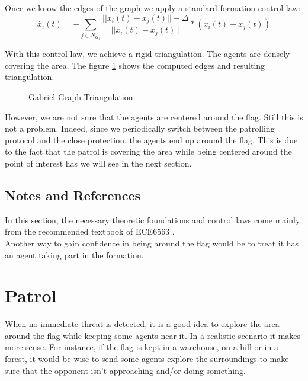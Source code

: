 \documentclass[journal]{IEEEtran}
\begin{document}
Once we know the edges of the graph we apply a standard formation control law:
\begin{equation}
\dot{x_i}(t) = - \sum_{j \in {N_G}_i} \frac{||x_i(t)-x_j(t)||-\Delta}{||x_i(t)-x_j(t)||}*(x_i(t)-x_j(t)) \label{eq1}
\end{equation}

With this control law, we achieve a rigid triangulation. The agents are densely covering the area. The figure \ref{gab_sim} shows the computed edges and resulting triangulation.\\
\begin{figure}
	\centering
	\qquad
	\caption{Gabriel Graph Triangulation}
	\label{gab_sim}
\end{figure}

However, we are not sure that the agents are centered around the flag. Still this is not a problem. Indeed, since we periodically switch between the patrolling protocol and the close protection, the agents end up around the flag. This is due to the fact that the patrol is covering the area while being centered around the point of interest has we will see in the next section.

\subsection{Notes and References}

In this section, the necessary theoretic foundations and control laws come mainly from the recommended textbook of ECE6563 \cite{b1}.\\

Another way to gain confidence in being around the flag would be to treat it has an agent taking part in the formation.

\section{Patrol}

When no immediate threat is detected, it is a good idea to explore the area around the flag while keeping some agents near it. In a realistic scenario it makes more sense. For instance, if the flag is kept in a warehouse, on a hill or in a forest, it would be wise to send some agents explore the surroundings to make sure that the opponent isn't approaching and/or doing something.\\
\end{document}
